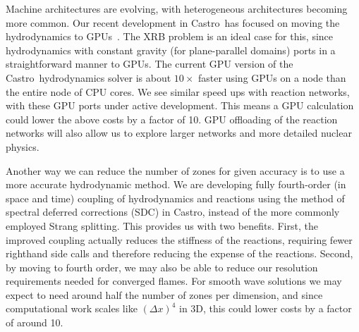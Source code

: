 \documentclass[a4paper]{jpconf}
\newcommand{\castro}{{\sffamily Castro}}
\newcommand{\MarginPar}[1]{\marginpar{\vskip-\baselineskip\raggedright\tiny\sffamily\hrule\smallskip{\color{red}#1}\par\smallskip\hrule}}
\begin{document}
Machine architectures are evolving, with heterogeneous architectures
becoming more common.  Our recent development in \castro\ has focused
on moving the hydrodynamics to GPUs~\cite{astronum:2017}.  The XRB
problem is an ideal case for this, since hydrodynamics with constant
gravity (for plane-parallel domains) ports in a straightforward manner
to GPUs.  The current GPU version of the \castro\ hydrodynamics solver
is about $10\times$ faster using GPUs on a node than the entire node
of CPU cores.  We see similar speed ups with reaction networks, with
these GPU ports under active development.  This means a GPU
calculation could lower the above costs by a factor of 10.  GPU
offloading of the reaction networks will also allow us to explore
larger networks and more detailed nuclear physics.

Another way we can reduce the number of zones for given accuracy is to use a more
accurate hydrodynamic method.  We are developing fully
fourth-order (in space and time) coupling of hydrodynamics and
reactions using the method of spectral deferred corrections (SDC) in
\castro, instead of the more commonly employed Strang splitting.  This
provides us with two benefits.  First, the improved coupling actually
reduces the stiffness of the reactions, requiring fewer righthand side
calls and therefore reducing the expense of the
reactions. \MarginPar{need some refs here} Second, by moving to fourth
order, we may also be able to reduce our resolution requirements
needed for converged flames. For smooth wave solutions we may expect to need
around half the number of zones per dimension, and since computational work
scales like $(\Delta x)^4$ in 3D, this could lower costs by a factor of around
10.
%
%
\end{document}
